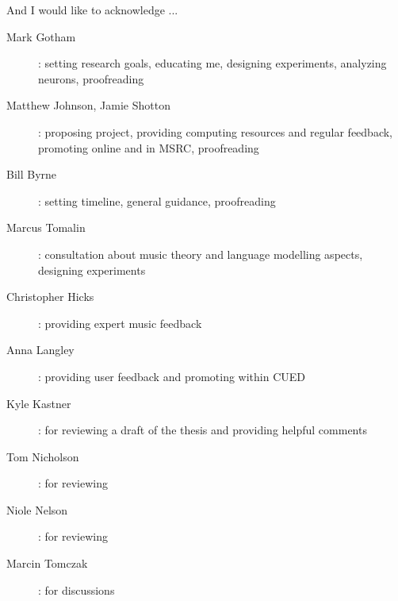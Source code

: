 
\begin{acknowledgements}


And I would like to acknowledge ...


\begin{description}
  \item[Mark Gotham]: setting research goals, educating me, designing experiments, analyzing neurons, proofreading
  \item[Matthew Johnson, Jamie Shotton]: proposing project, providing computing resources and regular feedback, promoting
    online and in MSRC, proofreading
  \item[Bill Byrne]: setting timeline, general guidance, proofreading
  \item[Marcus Tomalin]: consultation about music theory and language modelling aspects, designing experiments
  \item[Christopher Hicks]: providing expert music feedback
  \item[Anna Langley]: providing user feedback and promoting within CUED
  \item[Kyle Kastner]: for reviewing a draft of the thesis and providing helpful comments
  \item[Tom Nicholson]: for reviewing
  \item[Niole Nelson]: for reviewing
  \item[Marcin Tomczak]: for discussions
\end{description}

\end{acknowledgements}
